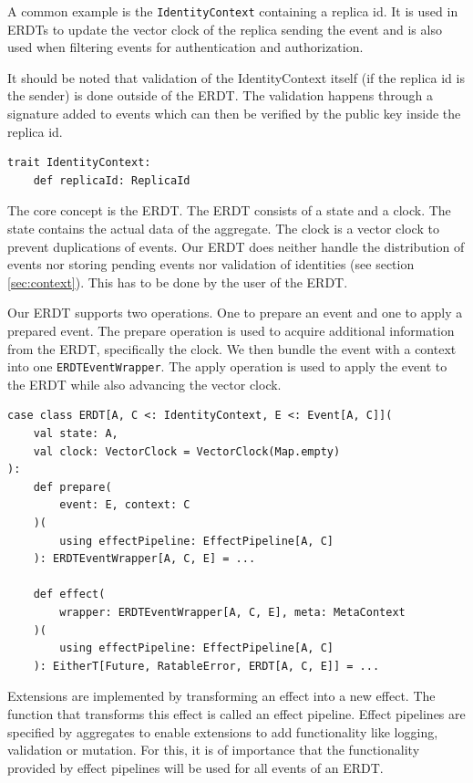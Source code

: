 \documentclass[
	english,
	ruledheaders=section,   %
	class=report,		    %
	thesis={type=bachelor}, %
	accentcolor=9c,			%
	custommargins=true,    %
	marginpar=false,        %
	parskip=half-,          %
	fontsize=11pt,          %
]{tudapub}
\begin{document}
A common example is the \texttt{IdentityContext} containing a replica id. It is used in ERDTs to update the vector clock of the replica sending the event and is also used when filtering events for authentication and authorization.

It should be noted that validation of the IdentityContext itself (if the replica id is the sender) is done outside of the ERDT. The validation happens through a signature added to events which can then be verified by the public key inside the replica id.

\begin{lstlisting}
trait IdentityContext:
	def replicaId: ReplicaId
\end{lstlisting}

The core concept is the ERDT. The ERDT consists of a state and a clock. The state contains the actual data of the aggregate. The clock is a vector clock to prevent duplications of events. Our ERDT does neither handle the distribution of events nor storing pending events nor validation of identities (see section \ref{sec:context}). This has to be done by the user of the ERDT.

Our ERDT supports two operations. One to prepare an event and one to apply a prepared event. The prepare operation is used to acquire additional information from the ERDT, specifically the clock. We then bundle the event with a context into one \texttt{ERDTEventWrapper}. The apply operation is used to apply the event to the ERDT while also advancing the vector clock.

\begin{lstlisting}
case class ERDT[A, C <: IdentityContext, E <: Event[A, C]](
	val state: A,
	val clock: VectorClock = VectorClock(Map.empty)
):
	def prepare(
		event: E, context: C
	)(
		using effectPipeline: EffectPipeline[A, C]
	): ERDTEventWrapper[A, C, E] = ...

	def effect(
		wrapper: ERDTEventWrapper[A, C, E], meta: MetaContext
	)(
		using effectPipeline: EffectPipeline[A, C]
	): EitherT[Future, RatableError, ERDT[A, C, E]] = ...
\end{lstlisting}

Extensions are implemented by transforming an effect into a new effect. The function that transforms this effect is called an effect pipeline. Effect pipelines are specified by aggregates to enable extensions to add functionality like logging, validation or mutation. For this, it is of importance that the functionality provided by effect pipelines will be used for all events of an ERDT. 
\end{document}
